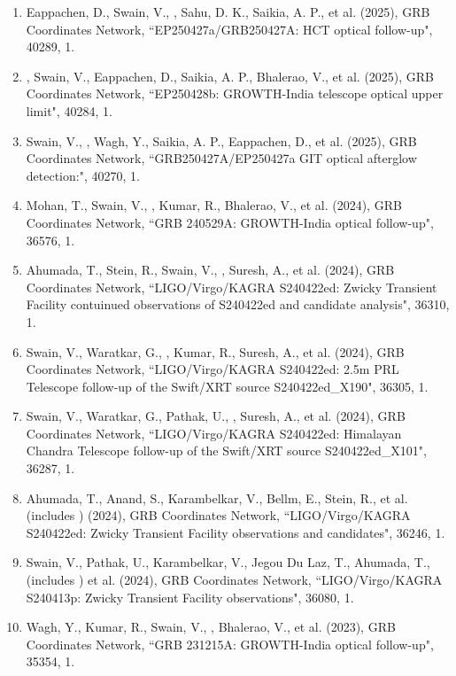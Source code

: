 \begin{enumerate}[leftmargin=*]
\item Eappachen, D., Swain, V., \me, Sahu, D. K., Saikia, A. P., et al. (2025), GRB Coordinates Network, {``EP250427a/GRB250427A: HCT optical follow-up"}, 40289, 1.

\item \me, Swain, V., Eappachen, D., Saikia, A. P., Bhalerao, V., et al. (2025), GRB Coordinates Network, {``EP250428b: GROWTH-India telescope optical upper limit"}, 40284, 1.

\item Swain, V., \me, Wagh, Y., Saikia, A. P., Eappachen, D., et al. (2025), GRB Coordinates Network, {``GRB250427A/EP250427a GIT optical afterglow detection:"}, 40270, 1.

\item Mohan, T., Swain, V., \me, Kumar, R., Bhalerao, V., et al. (2024), GRB Coordinates Network, {``GRB 240529A: GROWTH-India optical follow-up"}, 36576, 1.

\item Ahumada, T., Stein, R., Swain, V., \me, Suresh, A., et al. (2024), GRB Coordinates Network, {``LIGO/Virgo/KAGRA S240422ed: Zwicky Transient Facility contuinued observations of S240422ed and candidate analysis"}, 36310, 1.

\item Swain, V., Waratkar, G., \me, Kumar, R., Suresh, A., et al. (2024), GRB Coordinates Network, {``LIGO/Virgo/KAGRA S240422ed: 2.5m PRL Telescope follow-up of the Swift/XRT source S240422ed\_X190"}, 36305, 1.

\item Swain, V., Waratkar, G., Pathak, U., \me, Suresh, A., et al. (2024), GRB Coordinates Network, {``LIGO/Virgo/KAGRA S240422ed: Himalayan Chandra Telescope follow-up of the Swift/XRT source S240422ed\_X101"}, 36287, 1.

\item Ahumada, T., Anand, S., Karambelkar, V., Bellm, E., Stein, R., et al. (includes \me) (2024), GRB Coordinates Network, {``LIGO/Virgo/KAGRA S240422ed: Zwicky Transient Facility observations and candidates"}, 36246, 1.

\item Swain, V., Pathak, U., Karambelkar, V., Jegou Du Laz, T., Ahumada, T., (includes \me) et al. (2024), GRB Coordinates Network, {``LIGO/Virgo/KAGRA S240413p: Zwicky Transient Facility observations"}, 36080, 1.

\item Wagh, Y., Kumar, R., Swain, V., \me, Bhalerao, V., et al. (2023), GRB Coordinates Network, {``GRB 231215A: GROWTH-India optical follow-up"}, 35354, 1.


\end{enumerate}
